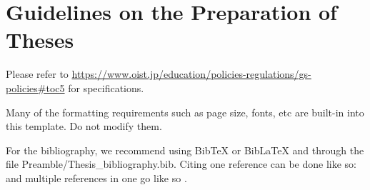 
\chapter{Guidelines on the Preparation of Theses} \label{ch-1}

Please refer to \url{https://www.oist.jp/education/policies-regulations/gs-policies#toc5} for specifications.

Many of the formatting requirements such as page size, fonts, etc are built-in into this template. Do not modify them.

For the bibliography, we recommend using BibTeX or BibLaTeX and through the file Preamble/Thesis\_bibliography.bib. Citing one reference can be done like so: \cite{Lee98} and multiple references in one go like so \cite{Fil09, Muc10, Kra27}.
